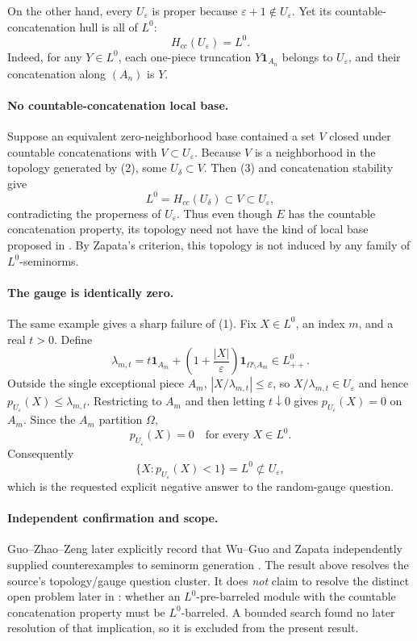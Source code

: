 \documentclass[10pt]{article}
\newcommand{\one}{\mathbf 1}
\begin{document}
On the other hand, every $U_\varepsilon$ is proper because
$\varepsilon+1\notin U_\varepsilon$.  Yet its countable-concatenation hull
is all of $L^0$:
\[
 H_{cc}(U_\varepsilon)=L^0.                                    \tag{3}
\]
Indeed, for any $Y\in L^0$, each one-piece truncation
$Y\one_{A_n}$ belongs to $U_\varepsilon$, and their concatenation along
$(A_n)$ is $Y$.

\paragraph{No countable-concatenation local base.}
Suppose an equivalent zero-neighborhood base contained a set $V$ closed
under countable concatenations with $V\subset U_\varepsilon$.  Because
$V$ is a neighborhood in the topology generated by (2), some
$U_\delta\subset V$.  Then (3) and concatenation stability give
\[
 L^0=H_{cc}(U_\delta)\subset V\subset U_\varepsilon,
\]
contradicting the properness of $U_\varepsilon$.  Thus even though $E$
has the countable concatenation property, its topology need not have the
kind of local base proposed in \cite{GZZ}.  By Zapata's criterion, this
topology is not induced by any family of $L^0$-seminorms.

\newpage
\paragraph{The gauge is identically zero.}
The same example gives a sharp failure of (1).  Fix $X\in L^0$, an index
$m$, and a real $t>0$.  Define
\[
 \lambda_{m,t}
 =t\one_{A_m}+\left(1+\frac{|X|}{\varepsilon}\right)
       \one_{\Omega\setminus A_m}\in L^0_{++}.
\]
Outside the single exceptional piece $A_m$,
$|X/\lambda_{m,t}|\leq\varepsilon$, so
$X/\lambda_{m,t}\in U_\varepsilon$ and hence
$p_{U_\varepsilon}(X)\leq\lambda_{m,t}$.  Restricting to $A_m$ and then
letting $t\downarrow0$ gives
$p_{U_\varepsilon}(X)=0$ on $A_m$.  Since the $A_m$ partition $\Omega$,
\[
 p_{U_\varepsilon}(X)=0\quad\text{for every }X\in L^0.          \tag{4}
\]
Consequently
\[
 \{X:p_{U_\varepsilon}(X)<1\}=L^0\not\subset U_\varepsilon,
\]
which is the requested explicit negative answer to the random-gauge
question.

\paragraph{Independent confirmation and scope.}
Guo--Zhao--Zeng later explicitly record that Wu--Guo and Zapata
independently supplied counterexamples to seminorm generation
\cite{GZZlater}.  The result above resolves the source's topology/gauge
question cluster.  It does \emph{not} claim to resolve the distinct open
problem later in \cite{GZZ}: whether an $L^0$-pre-barreled module with the
countable concatenation property must be $L^0$-barreled.  A bounded search
found no later resolution of that implication, so it is excluded from the
present result.
\end{document}
